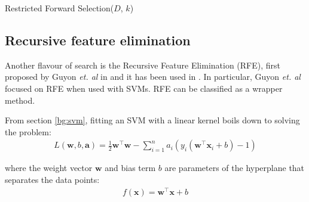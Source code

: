\documentclass[12pt, twoside, a4paper]{report}
\def\vec{\boldsymbol}
\begin{document}
\begin{algorithm}
\DontPrintSemicolon
{}
\BlankLine
{}
\caption{Restricted Forward Selection($D$, $k$) \label{RFSAlgo}}
\end{algorithm}


\subsection{Recursive feature elimination} \label{bg:fs:rfe}
Another flavour of search is the Recursive Feature Elimination (RFE), first proposed by Guyon \textit{et. al} in \cite{RefWorks:228} and it has been used in \cite{RefWorks:229, RefWorks:230, RefWorks:231}. In particular, Guyon \textit{et. al} focused on RFE when used with SVMs. RFE can be classified as a wrapper method.

From section \ref{bg:svm}, fitting an SVM with a linear kernel boils down to solving the problem:
\begin{align*}
L(\boldsymbol w, b, \boldsymbol a)
= \frac{1}{2} \boldsymbol w^\top \boldsymbol w - \sum_{i=1}^n a_i (y_i(\boldsymbol w^\top \boldsymbol x_i + b) - 1)
\end{align*}

where the weight vector $\vec{w}$ and bias term $b$ are parameters of the hyperplane that separates the data points:
\begin{align*}
f(\vec{x}) = \vec{w}^\top \vec{x} + b
\end{align*}
\end{document}
